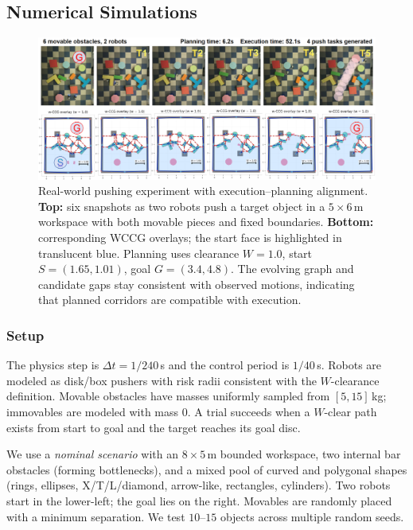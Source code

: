 \subsection{Numerical Simulations}
\label{subsec:sim}
\begin{figure}[t]
  \centering
  \includegraphics[width=0.95\linewidth]{figures/hardware_wccg.png}
  \vspace{-4mm}
  \caption{Real-world pushing experiment with execution--planning alignment. \textbf{Top:} six snapshots as two robots push a target object in a \(5{\times}6\,\mathrm{m}\) workspace with both movable pieces and fixed boundaries. \textbf{Bottom:} corresponding WCCG overlays; the start face is highlighted in translucent blue. Planning uses clearance \(W{=}1.0\), start \(S{=}(1.65,1.01)\), goal \(G{=}(3.4,4.8)\). The evolving graph and candidate gaps stay consistent with observed motions, indicating that planned corridors are compatible with execution.}
  \vspace{-4mm}
  \label{fig:hardware}
\end{figure}

\subsubsection{Setup}
\label{subsec:sim-setup}
The physics step is $\Delta t=1/240$\,s and the control period is $1/40$\,s. Robots are modeled as disk/box pushers with risk radii consistent with the $W$-clearance definition. Movable obstacles have masses uniformly sampled from $[5,15]$\,kg; immovables are modeled with mass $0$. A trial succeeds when a $W$-clear path exists from start to goal and the target reaches its goal disc.

We use a \emph{nominal scenario} with an $8{\times}5$\,m bounded workspace, two internal bar obstacles (forming bottlenecks), and a mixed pool of curved and polygonal shapes (rings, ellipses, X/T/L/diamond, arrow-like, rectangles, cylinders). Two robots start in the lower-left; the goal lies on the right. Movables are randomly placed with a minimum separation. We test $10\text{--}15$ objects across multiple random seeds.

